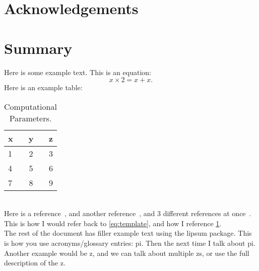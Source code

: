 \documentclass[11pt, letterpaper, oneside]{article}  %
\begin{document}
\clearpage \doublespacing \pagestyle{plain}%
\section*{Acknowledgements}
\lipsum[39]
\newpage%


\section*{Summary}
Here is some example text.
This is an equation:
\begin{equation}\label{eq:template}
    x \times 2 = x + x.
\end{equation}
Here is an example table:
\begin{table}[h!]
    \centering
    \begin{tabular}{ l c r }
        \toprule
        x & y & z \\
        \midrule
        1 & 2 & 3 \\
        4 & 5 & 6 \\
        7 & 8 & 9 \\
    \end{tabular}
    \caption{\label{table:one} Computational Parameters.}
\end{table}\\
Here is a reference~\cite{goodfellow1990molecular}, and another reference~\cite{schmidt2014inclusion}, and 3 different references at once~\cite{sarsa2000path,constable2013langevin,goodfellow1990molecular}.
This is how I would refer back to \cref{eq:template}, and how I reference \cref{table:one}.\\
The rest of the document has filler example text using the lipsum package.
This is how you use acronyms/glossary entries: \gls{pi}. Then the next time I talk about \gls{pi}. Another example would be \gls{z}, and we can talk about multiple \glspl{z}, or use the full description of the \glsdesc{z}.
\newpage
\end{document}
